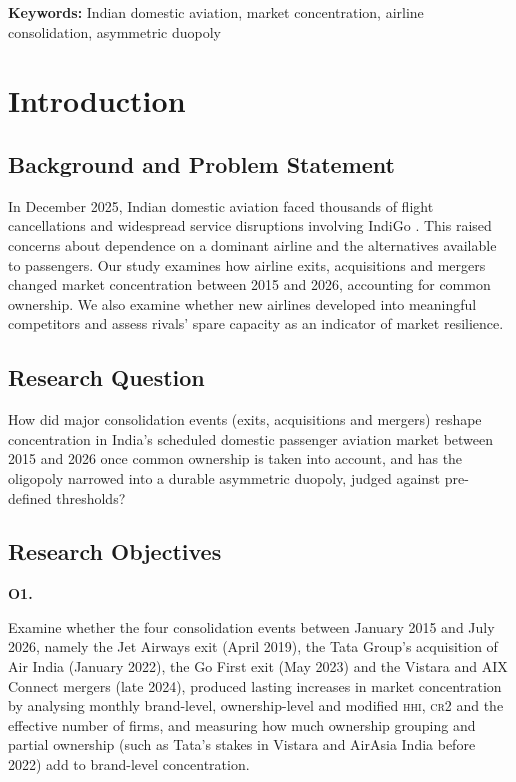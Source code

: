 \documentclass[12pt,a4paper]{article}
\newenvironment{authorcontribution}[1]{\par\begingroup\color{#1}}{\par\endgroup}
\newcommand{\HHI}{\textsc{hhi}}
\newcommand{\CRtwo}{\textsc{cr2}}
\begin{document}
\vspace{0.5cm}
\textbf{Keywords:} Indian domestic aviation, market concentration, airline consolidation, asymmetric duopoly

\section{Introduction}
\subsection{Background and Problem Statement}
In December 2025, Indian domestic aviation faced thousands of flight cancellations and widespread service disruptions involving IndiGo \parencite{gupta2025antitrust}. This raised concerns about dependence on a dominant airline and the alternatives available to passengers. Our study examines how airline exits, acquisitions and mergers changed market concentration between 2015 and 2026, accounting for common ownership. We also examine whether new airlines developed into meaningful competitors and assess rivals' spare capacity as an indicator of market resilience.

\subsection{Research Question}
How did major consolidation events (exits, acquisitions and mergers) reshape concentration in India's scheduled domestic passenger aviation market between 2015 and 2026 once common ownership is taken into account, and has the oligopoly narrowed into a durable asymmetric duopoly, judged against pre-defined thresholds?

\subsection{Research Objectives}
\begin{authorcontribution}{authorSowmya}
\hypertarget{objective:1}{\textbf{O1.}} Examine whether the four consolidation events between January 2015 and July 2026, namely the Jet Airways exit (April 2019), the Tata Group's acquisition of Air India (January 2022), the Go First exit (May 2023) and the Vistara and AIX Connect mergers (late 2024), produced lasting increases in market concentration by analysing monthly brand-level, ownership-level and modified \HHI{}, \CRtwo{} and the effective number of firms, and measuring how much ownership grouping and partial ownership (such as Tata's stakes in Vistara and AirAsia India before 2022) add to brand-level concentration.
\par
\end{authorcontribution}
\end{document}
